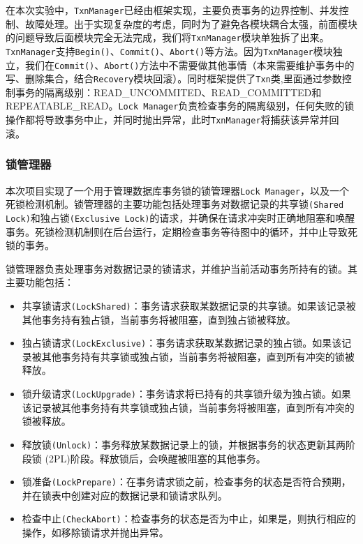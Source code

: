 \documentclass[12pt]{article}
\begin{document}
    在本次实验中，\texttt{TxnManager}已经由框架实现，主要负责事务的边界控制、并发控制、故障处理。出于实现复杂度的考虑，同时为了避免各模块耦合太强，前面模块的问题导致后面模块完全无法完成，我们将\texttt{TxnManager}模块单独拆了出来。\texttt{TxnManager}支持\texttt{Begin()}、\texttt{Commit()}、\texttt{Abort()}等方法。因为\texttt{TxnManager}模块独立，我们在\texttt{Commit()}、\texttt{Abort()}方法中不需要做其他事情（本来需要维护事务中的写、删除集合，结合\texttt{Recovery}模块回滚）。同时框架提供了\texttt{Txn}类,里面通过参数控制事务的隔离级别：READ\_UNCOMMITED、READ\_COMMITTED和REPEATABLE\_READ。\texttt{Lock Manager}负责检查事务的隔离级别，任何失败的锁操作都将导致事务中止，并同时抛出异常，此时\texttt{TxnManager}将捕获该异常并回滚。

    \subsubsection{锁管理器}
    本次项目实现了一个用于管理数据库事务锁的锁管理器\texttt{Lock Manager}，以及一个死锁检测机制。锁管理器的主要功能包括处理事务对数据记录的共享锁\texttt{(Shared Lock)}和独占锁\texttt{(Exclusive Lock)}的请求，并确保在请求冲突时正确地阻塞和唤醒事务。死锁检测机制则在后台运行，定期检查事务等待图中的循环，并中止导致死锁的事务。

    锁管理器负责处理事务对数据记录的锁请求，并维护当前活动事务所持有的锁。其主要功能包括：
    \begin{itemize}
        \item 共享锁请求\texttt{(LockShared)}：事务请求获取某数据记录的共享锁。如果该记录被其他事务持有独占锁，当前事务将被阻塞，直到独占锁被释放。
        \item 独占锁请求\texttt{(LockExclusive)}：事务请求获取某数据记录的独占锁。如果该记录被其他事务持有共享锁或独占锁，当前事务将被阻塞，直到所有冲突的锁被释放。
        \item 锁升级请求\texttt{(LockUpgrade)}：事务请求将已持有的共享锁升级为独占锁。如果该记录被其他事务持有共享锁或独占锁，当前事务将被阻塞，直到所有冲突的锁被释放。
        \item 释放锁\texttt{(Unlock)}：事务释放某数据记录上的锁，并根据事务的状态更新其两阶段锁 (2PL)阶段。释放锁后，会唤醒被阻塞的其他事务。
        \item 锁准备\texttt{(LockPrepare)}：在事务请求锁之前，检查事务的状态是否符合预期，并在锁表中创建对应的数据记录和锁请求队列。
        \item 检查中止\texttt{(CheckAbort)}：检查事务的状态是否为中止，如果是，则执行相应的操作，如移除锁请求并抛出异常。
    \end{itemize}
\end{document}
